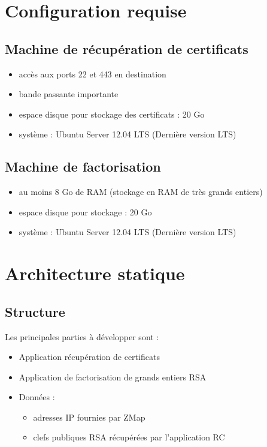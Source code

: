 \documentclass[a4paper,11pt,french]{article}
\begin{document}
\section{Configuration requise}
\subsection{Machine de récupération de certificats}
\begin{itemize}
\item accès aux ports 22 et 443 en destination
\item bande passante importante
\item espace disque pour stockage des certificats : 20 Go
\item système : Ubuntu Server 12.04 LTS (Dernière version LTS)
\end{itemize}

\subsection{Machine de factorisation}
\begin{itemize}
\item au moins 8 Go de RAM (stockage en RAM de très grands entiers)
\item espace disque pour stockage : 20 Go
\item système : Ubuntu Server 12.04 LTS (Dernière version LTS)
\end{itemize}

\section{Architecture statique}

\subsection{Structure}
Les principales parties à développer sont :
\begin{itemize}
\item Application récupération de certificats
\item Application de factorisation de grands entiers RSA
\item Données :
\begin{itemize}
\item adresses IP fournies par ZMap
\item clefs publiques RSA récupérées par l'application RC
\end{itemize}
\end{itemize}
\end{document}
